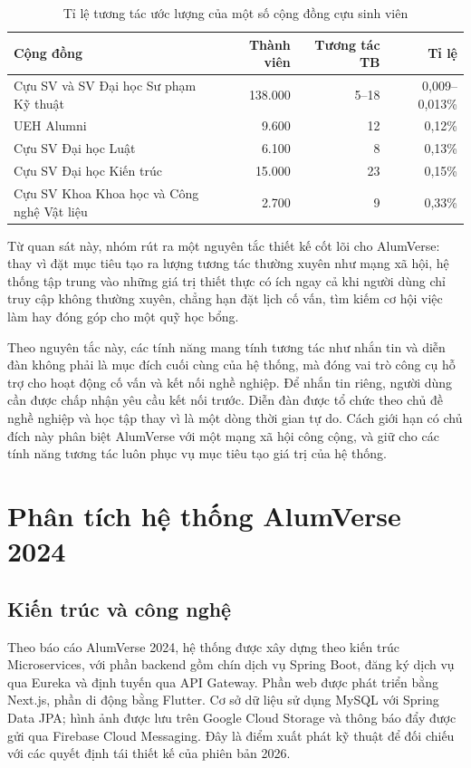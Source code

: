 \documentclass[12pt,a4paper,oneside]{report}
\begin{document}
\renewcommand{\arraystretch}{1.25}
\begin{table}[H]
\centering
\small
\caption{Tỉ lệ tương tác ước lượng của một số cộng đồng cựu sinh viên}
\label{tab:engagement}
\begin{tabular}{|>{\raggedright\arraybackslash}p{6.4cm}|r|r|r|}
\hline
\textbf{Cộng đồng} & \textbf{Thành viên} & \textbf{Tương tác TB} & \textbf{Tỉ lệ} \\ \hline
Cựu SV và SV Đại học Sư phạm Kỹ thuật & 138.000 & 5--18 & 0,009--0,013\% \\ \hline
UEH Alumni & 9.600 & 12 & 0,12\% \\ \hline
Cựu SV Đại học Luật & 6.100 & 8 & 0,13\% \\ \hline
Cựu SV Đại học Kiến trúc & 15.000 & 23 & 0,15\% \\ \hline
Cựu SV Khoa Khoa học và Công nghệ Vật liệu & 2.700 & 9 & 0,33\% \\ \hline
\end{tabular}
\end{table}
\renewcommand{\arraystretch}{1}

Từ quan sát này, nhóm rút ra một nguyên tắc thiết kế cốt lõi cho AlumVerse: thay vì đặt mục tiêu tạo ra lượng tương tác thường xuyên như mạng xã hội, hệ thống tập trung vào những giá trị thiết thực có ích ngay cả khi người dùng chỉ truy cập không thường xuyên, chẳng hạn đặt lịch cố vấn, tìm kiếm cơ hội việc làm hay đóng góp cho một quỹ học bổng.

Theo nguyên tắc này, các tính năng mang tính tương tác như nhắn tin và diễn đàn không phải là mục đích cuối cùng của hệ thống, mà đóng vai trò công cụ hỗ trợ cho hoạt động cố vấn và kết nối nghề nghiệp. Để nhắn tin riêng, người dùng cần được chấp nhận yêu cầu kết nối trước. Diễn đàn được tổ chức theo chủ đề nghề nghiệp và học tập thay vì là một dòng thời gian tự do. Cách giới hạn có chủ đích này phân biệt AlumVerse với một mạng xã hội công cộng, và giữ cho các tính năng tương tác luôn phục vụ mục tiêu tạo giá trị của hệ thống.

\section{Phân tích hệ thống AlumVerse 2024}

\subsection{Kiến trúc và công nghệ}

Theo báo cáo AlumVerse 2024, hệ thống được xây dựng theo kiến trúc Microservices, với phần backend gồm chín dịch vụ Spring Boot, đăng ký dịch vụ qua Eureka và định tuyến qua API Gateway. Phần web được phát triển bằng Next.js, phần di động bằng Flutter. Cơ sở dữ liệu sử dụng MySQL với Spring Data JPA; hình ảnh được lưu trên Google Cloud Storage và thông báo đẩy được gửi qua Firebase Cloud Messaging. Đây là điểm xuất phát kỹ thuật để đối chiếu với các quyết định tái thiết kế của phiên bản 2026.
\end{document}
